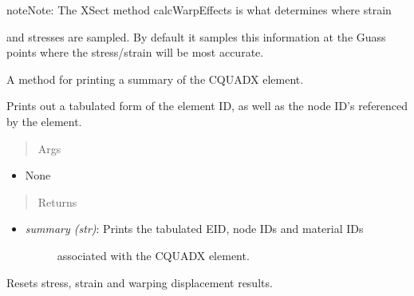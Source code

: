 \documentclass[letterpaper,10pt,english]{sphinxmanual}
\begin{document}
\begin{fulllineitems}
\begin{fulllineitems}
\begin{notice}{note}{Note:}
The XSect method calcWarpEffects is what determines where strain
\end{notice}

and stresses are sampled. By default it samples this information at the
Guass points where the stress/strain will be most accurate.

\end{fulllineitems}


\begin{fulllineitems}
\label{structures:AeroComBAT.Structures.CQUADX.printSummary}
A method for printing a summary of the CQUADX element.

Prints out a tabulated form of the element ID, as well as the node ID's
referenced by the element.
\begin{quote}\begin{description}
\item[{Args}] \leavevmode
\end{description}\end{quote}
\begin{itemize}
\item {} 
None

\end{itemize}
\begin{quote}\begin{description}
\item[{Returns}] \leavevmode
\end{description}\end{quote}
\begin{itemize}
\item {} \begin{description}
\item[{\emph{summary (str)}: Prints the tabulated EID, node IDs and material IDs}] \leavevmode
associated with the CQUADX element.

\end{description}

\end{itemize}

\end{fulllineitems}


\begin{fulllineitems}
\label{structures:AeroComBAT.Structures.CQUADX.resetResults}
Resets stress, strain and warping displacement results.


\end{fulllineitems}
\end{fulllineitems}
\end{document}
